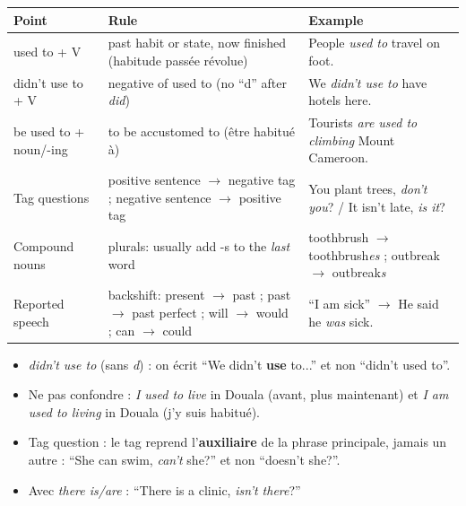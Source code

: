 \documentclass[11pt]{article}
\newcommand{\cle}[1]{{\popxbold\color{popdark}#1}}
\begin{document}
\begin{aretenir}
\begin{center}
\begin{tabularx}{\linewidth}{|l|X|X|}\hline
\rowcolor{popblueL} \textbf{Point} & \textbf{Rule} & \textbf{Example} \\ \hline
\cle{used to} + V & past habit or state, now finished (habitude passée révolue) & People \emph{used to} travel on foot. \\ \hline
\cle{didn't use to} + V & negative of used to (no ``d'' after \emph{did}) & We \emph{didn't use to} have hotels here. \\ \hline
\cle{be used to} + noun/-ing & to be accustomed to (être habitué à) & Tourists \emph{are used to climbing} Mount Cameroon. \\ \hline
\cle{Tag questions} & positive sentence $\to$ negative tag ; negative sentence $\to$ positive tag & You plant trees, \emph{don't you}? / It isn't late, \emph{is it}? \\ \hline
\cle{Compound nouns} & plurals: usually add -s to the \emph{last} word & toothbrush $\to$ toothbrush\emph{es} ; outbreak $\to$ outbreak\emph{s} \\ \hline
\cle{Reported speech} & backshift: present $\to$ past ; past $\to$ past perfect ; will $\to$ would ; can $\to$ could & ``I am sick'' $\to$ He said he \emph{was} sick. \\ \hline
\end{tabularx}
\end{center}
\end{aretenir}

\begin{attention}
\begin{itemize}
\item \emph{didn't use to} (sans \emph{d}) : on écrit ``We didn't \textbf{use} to...'' et non ``didn't used to''.
\item Ne pas confondre : \emph{I used to live} in Douala (avant, plus maintenant) et \emph{I am used to living} in Douala (j'y suis habitué).
\item Tag question : le tag reprend l'\textbf{auxiliaire} de la phrase principale, jamais un autre : ``She can swim, \emph{can't} she?'' et non ``doesn't she?''.
\item Avec \emph{there is/are} : ``There is a clinic, \emph{isn't there}?''
\end{itemize}
\end{attention}
\end{document}

